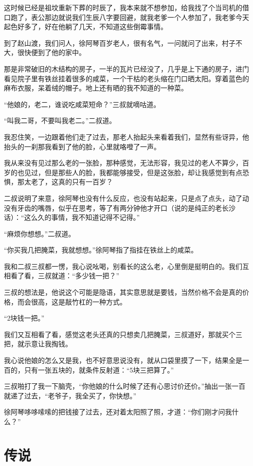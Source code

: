 这时候已经是祖坟重新下葬的时辰了，我本来就不想参加，给我找了个当司机的借口跑了，表公那边就说我们生辰八字要回避，就我老爹一个人参加了，我老爹今天起色好多了，好在他躺了几天，不知道这些倒霉事情。

到了赵山渡，我们问人，徐阿琴百岁老人，很有名气，一问就问了出来，村子不大，很快便到了他的家中。

那是非常破旧的木结构的房子，一半的瓦片已经没了，几乎是上下通的房子，进门看见院子里有铁丝挂着很多的咸菜，一个干枯的老头缩在门口晒太阳。穿着蓝色的麻布衣服，呆着绒的帽子。地上还有晒的我不知道的一种菜。

“他娘的，老二，谁说吃咸菜短命？”三叔就嘀咕道。

“叫我二哥，不要叫我老二。”二叔道。

我忍住笑，一边跟着他们走了过去，那老人抬起头来看着我们，显然有些讶异，他抬头的一刹那我看到了他的脸，心里就咯噔了一声。

我从来没有见过那么老的一张脸，那种感觉，无法形容，我见过的老人不算少，百岁的也见过，但是那些人的脸，我都能够接受，但是这张脸，却让我感觉到有点恐惧，那太老了，这真的只有一百岁？

二叔说明了来意，徐阿琴也没有什么反应，也没有站起来，只是点了点头，动了动没有牙齿的嘴唇，似乎在思考，等了有两分钟他才开口（说的是纯正的老长沙话）：“这么久的事情，我不知道记得不记得。”

“麻烦你想想。”二叔道。

“你买我几把腌菜，我就想想。”徐阿琴指了指挂在铁丝上的咸菜。

我和二叔三叔都一愣，我心说吆喝，别看长的这么老，心里倒是挺明白的。我们互相看了看，三叔就道：“多少钱一把？”

三叔的想法是，他说这个可能是隐语，其实意思就是要钱，当然价格不会是真的价格，而会很高，这是敲竹杠的一种方式。

“2块钱一把。”

我们又互相看了看，感觉这老头还真的只想卖几把腌菜，三叔道好，那就买个三把，就示意让我掏钱。

我心说他娘的怎么又是我，也不好意思说没有，就从口袋里摸了一下，结果全是一百的，只有一张五块的，就条件反射道：“5块三把算了。”

三叔啪打了我一下脑壳，“你他娘的什么时候了还有心思讨价还价。”抽出一张一百就递了过去，“老爷子，我全买了，你快想。”

徐阿琴哆哆嗦嗦的把钱接了过去，还对着太阳照了照，才道：“你们刚才问我什么？”

\chapter{传说}

